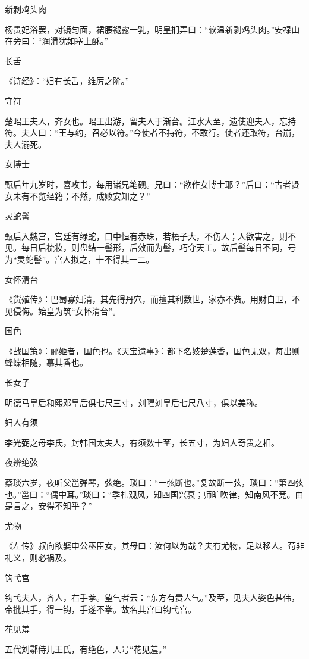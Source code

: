 \documentclass[a4paper,12pt,UTF8,twoside]{ctexbook}
\begin{document}
    新剥鸡头肉
    
    杨贵妃浴罢，对镜匀面，裙腰褪露一乳，明皇扪弄曰：“软温新剥鸡头肉。”安禄山在旁曰：“润滑犹如塞上酥。”
    
    长舌
    
    《诗经》：“妇有长舌，维厉之阶。”
    
    守符
    
    楚昭王夫人，齐女也。昭王出游，留夫人于渐台。江水大至，遗使迎夫人，忘持符。夫人曰：“王与约，召必以符。”今使者不持符，不敢行。使者还取符，台崩，夫人溺死。
    
    女博士
    
    甄后年九岁时，喜攻书，每用诸兄笔砚。兄曰：“欲作女博士耶？”后曰：“古者贤女未有不览经籍；不然，成败安知之？”
    
    灵蛇髻
    
    甄后入魏宫，宫廷有绿蛇，口中恒有赤珠，若梧子大，不伤人；人欲害之，则不见。每日后梳妆，则盘结一髻形，后效而为髻，巧夺天工。故后髻每日不同，号为“灵蛇髻”。宫人拟之，十不得其一二。
    
    女怀清台
    
    《货殖传》：巴蜀寡妇清，其先得丹穴，而擅其利数世，家亦不赀。用财自卫，不见侵侮。始皇为筑“女怀清台”。
    
    国色
    
    《战国策》：郦姬者，国色也。《天宝遗事》：都下名妓楚莲香，国色无双，每出则蜂蝶相随，慕其香也。
    
    长女子
    
    明德马皇后和熙邓皇后俱七尺三寸，刘曜刘皇后七尺八寸，俱以美称。
    
    妇人有须
    
    李光弼之母李氏，封韩国太夫人，有须数十茎，长五寸，为妇人奇贵之相。
    
    夜辨绝弦
    
    蔡琰六岁，夜听父邕弹琴，弦绝。琰曰：“一弦断也。”复故断一弦，琰曰：“第四弦也。”邕曰：“偶中耳。”琰曰：“季札观风，知四国兴衰；师旷吹律，知南风不竞。由是言之，安得不知乎？”
    
    尤物
    
    《左传》叔向欲娶申公巫臣女，其母曰：汝何以为哉？夫有尤物，足以移人。苟非礼义，则必祸及。
    
    钩弋宫
    
    钩弋夫人，齐人，右手拳。望气者云：“东方有贵人气。”及至，见夫人姿色甚伟，帝批其手，得一钩，手遂不拳。故名其宫曰钩弋宫。
    
    花见羞
    
    五代刘鄩侍儿王氏，有绝色，人号“花见羞。”
    
\end{document}
